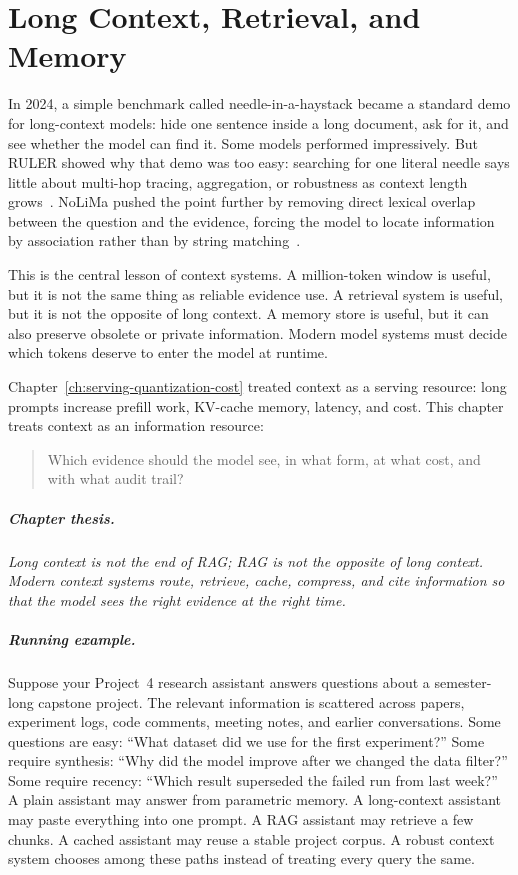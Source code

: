 \chapter{Long Context, Retrieval, and Memory}
\label{ch:long-context-retrieval-memory}
\raggedbottom

In 2024, a simple benchmark called needle-in-a-haystack became a standard demo for long-context models: hide one sentence inside a long document, ask for it, and see whether the model can find it. Some models performed impressively. But RULER showed why that demo was too easy: searching for one literal needle says little about multi-hop tracing, aggregation, or robustness as context length grows~\cite{hsieh2024ruler}. NoLiMa pushed the point further by removing direct lexical overlap between the question and the evidence, forcing the model to locate information by association rather than by string matching~\cite{modarressi2025nolima}.

This is the central lesson of context systems. A million-token window is useful, but it is not the same thing as reliable evidence use. A retrieval system is useful, but it is not the opposite of long context. A memory store is useful, but it can also preserve obsolete or private information. Modern model systems must decide which tokens deserve to enter the model at runtime.

Chapter~\ref{ch:serving-quantization-cost} treated context as a serving resource: long prompts increase prefill work, KV-cache memory, latency, and cost. This chapter treats context as an information resource:

\begin{quote}
Which evidence should the model see, in what form, at what cost, and with what audit trail?
\end{quote}

\paragraph{Chapter thesis.} \emph{Long context is not the end of RAG; RAG is not the opposite of long context. Modern context systems route, retrieve, cache, compress, and cite information so that the model sees the right evidence at the right time.}

\paragraph{Running example.} Suppose your Project~4 research assistant answers questions about a semester-long capstone project. The relevant information is scattered across papers, experiment logs, code comments, meeting notes, and earlier conversations. Some questions are easy: ``What dataset did we use for the first experiment?'' Some require synthesis: ``Why did the model improve after we changed the data filter?'' Some require recency: ``Which result superseded the failed run from last week?'' A plain assistant may answer from parametric memory. A long-context assistant may paste everything into one prompt. A RAG assistant may retrieve a few chunks. A cached assistant may reuse a stable project corpus. A robust context system chooses among these paths instead of treating every query the same.

